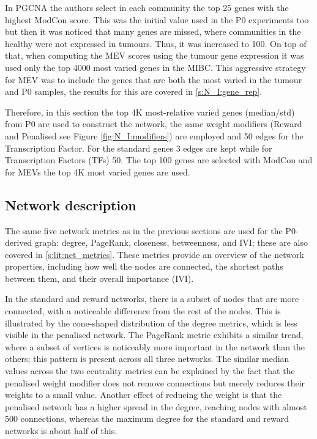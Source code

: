 
In PGCNA \citet{Care2019-ij} the authors select in each community the top 25 genes with the highest ModCon score. This was the initial value used in the P0 experiments too but then it was noticed that many genes are missed, where communities in the healthy were not expressed in tumours. Thus, it was increased to 100. On top of that, when computing the MEV scores using the tumour gene expression it was used only the top 4000 most varied genes in the MIBC. This aggressive strategy for MEV was to include the genes that are both the most varied in the tumour and P0 samples, the results for this are covered in \cref{s:N_I:gene_rep}.

Therefore, in this section the top 4K most-relative varied genes (median/std) from P0 are used to construct the network, the same weight modifiers (Reward and Penalised see Figure \ref{fig:N_I:modifiers}) are employed and 50 edges for the Transcription Factor. For the standard genes 3 edges are kept while for Transcription Factors (TFs) 50. The top 100 genes are selected with ModCon and for MEVs the top 4K most varied genes are used.

\subsection{Network description} \label{s:N_I:p0_tum_description}

The same five network metrics as in the previous sections are used for the P0-derived graph: degree, PageRank, closeness, betweenness, and IVI; these are also covered in \cref{s:lit:net_metrics}. These metrics provide an overview of the network properties, including how well the nodes are connected, the shortest paths between them, and their overall importance (IVI).

In the standard and reward networks, there is a subset of nodes that are more connected, with a noticeable difference from the rest of the nodes. This is illustrated by the cone-shaped distribution of the degree metrics, which is less visible in the penalised network. The PageRank metric exhibits a similar trend, where a subset of vertices is noticeably more important in the network than the others; this pattern is present across all three networks. The similar median values across the two centrality metrics can be explained by the fact that the penalised weight modifier does not remove connections but merely reduces their weights to a small value. Another effect of reducing the weight is that the penalised network has a higher spread in the degree, reaching nodes with almost 500 connections, whereas the maximum degree for the standard and reward networks is about half of this.

